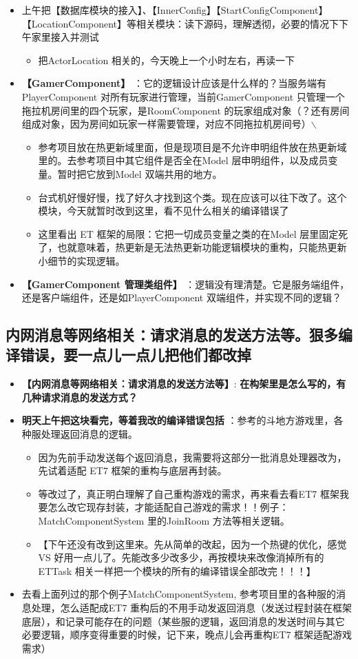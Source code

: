 \documentclass[9pt, b5paper]{article}
\begin{document}
\begin{itemize}
\item 上午把【数据库模块的接入】、【InnerConfig】【StartConfigComponent】【LocationComponent】等相关模块：读下源码，理解透彻，必要的情况下下午家里接入并测试
\begin{itemize}
\item 把ActorLocation 相关的，今天晚上一个小时左右，再读一下
\end{itemize}
\item \textbf{【GamerComponent】} ：它的逻辑设计应该是什么样的？当服务端有 PlayerComponent 对所有玩家进行管理，当前GamerComponent 只管理一个拖拉机房间里的四个玩家，是RoomComponent 的玩家组成对象（？还有房间组成对象，因为房间如玩家一样需要管理，对应不同拖拉机房间号）$\backslash$
\begin{itemize}
\item 参考项目放在热更新域里面，但是现项目是不允许申明组件放在热更新域里的。去参考项目中其它组件是否全在Model 层申明组件，以及成员变量。暂时把它放到Model 双端共用的地方。
\item 台式机好慢好慢，找了好久才找到这个类。现在应该可以往下改了。这个模块，今天就暂时改到这里，看不见什么相关的编译错误了
\item 这里看出 ET 框架的局限：它把一切成员变量之类的在Model 层里固定死了，也就意味着，热更新是无法热更新功能逻辑模块的重构，只能热更新小细节的实现逻辑。
\end{itemize}
\item \textbf{【GamerComponent 管理类组件】} ：逻辑没有理清楚。它是服务端组件，还是客户端组件，还是如PlayerComponent 双端组件，并实现不同的逻辑？
\end{itemize}
\subsection{内网消息等网络相关：请求消息的发送方法等。狠多编译错误，要一点儿一点儿把他们都改掉}
\label{sec:orge99b14a}
\begin{itemize}
\item \textbf{【内网消息等网络相关：请求消息的发送方法等】}: \textbf{在构架里是怎么写的，有几种请求消息的发送方式？}
\item \textbf{明天上午把这块看完，等着我改的编译错误包括} ：参考的斗地方游戏里，各种服处理返回消息的逻辑。
\begin{itemize}
\item 因为先前手动发送每个返回消息，我需要将这部分一批消息处理器改为，先试着适配 ET7 框架的重构与底层再封装。
\item 等改过了，真正明白理解了自己重构游戏的需求，再来看去看ET7 框架我要怎么改它现存封装，才能适配自己游戏的需求！！例子：MatchComponentSystem 里的JoinRoom 方法等相关逻辑。
\item 【下午还没有改到这里来。先从简单的改起，因为一个热键的优化，感觉VS 好用一点儿了。先能改多少改多少，再按模块来改像消掉所有的ETTask 相关一样把一个模块的所有的编译错误全部改完！！！】
\end{itemize}
\item 去看上面列过的那个例子MatchComponentSystem, 参考项目里的各种服的消息处理，怎么适配成ET7 重构后的不用手动发返回消息（发送过程封装在框架底层），和记录可能存在的问题（某些服的逻辑，返回消息的发送时间与其它必要逻辑，顺序变得重要的时候，记下来，晚点儿会再重构ET7 框架适配游戏需求）
\end{itemize}
\end{document}
